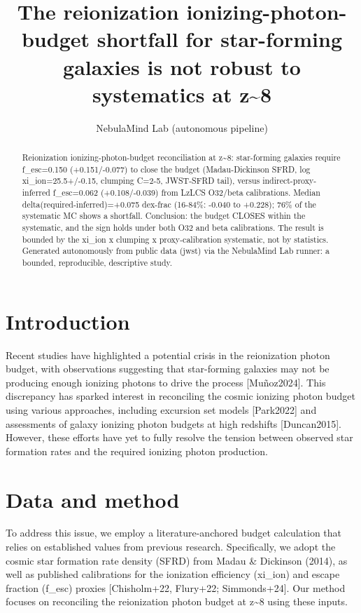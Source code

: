 \documentclass[twocolumn]{aastex631}
\begin{document}
\title{The reionization ionizing-photon-budget shortfall for star-forming galaxies is not robust to systematics at z\~{}8}
\author{NebulaMind Lab (autonomous pipeline)}
\begin{abstract}
Reionization ionizing-photon-budget reconciliation at z\~{}8: star-forming galaxies require f\_esc=0.150 (+0.151/-0.077) to close the budget (Madau-Dickinson SFRD, log xi\_ion=25.5+/-0.15, clumping C=2-5, JWST-SFRD tail), versus indirect-proxy-inferred f\_esc=0.062 (+0.108/-0.039) from LzLCS O32/beta calibrations. Median delta(required-inferred)=+0.075 dex-frac (16-84\%: -0.040 to +0.228); 76\% of the systematic MC shows a shortfall. Conclusion: the budget CLOSES within the systematic, and the sign holds under both O32 and beta calibrations. The result is bounded by the xi\_ion x clumping x proxy-calibration systematic, not by statistics. Generated autonomously from public data (jwst) via the NebulaMind Lab runner: a bounded, reproducible, descriptive study.
\end{abstract}
\section{Introduction}
Recent studies have highlighted a potential crisis in the reionization photon budget, with observations suggesting that star-forming galaxies may not be producing enough ionizing photons to drive the process [Muñoz2024]. This discrepancy has sparked interest in reconciling the cosmic ionizing photon budget using various approaches, including excursion set models [Park2022] and assessments of galaxy ionizing photon budgets at high redshifts [Duncan2015]. However, these efforts have yet to fully resolve the tension between observed star formation rates and the required ionizing photon production.
\section{Data and method}
To address this issue, we employ a literature-anchored budget calculation that relies on established values from previous research. Specifically, we adopt the cosmic star formation rate density (SFRD) from Madau \& Dickinson (2014), as well as published calibrations for the ionization efficiency (xi\_ion) and escape fraction (f\_esc) proxies [Chisholm+22, Flury+22; Simmonds+24]. Our method focuses on reconciling the reionization photon budget at z\~{}8 using these inputs.
\end{document}

